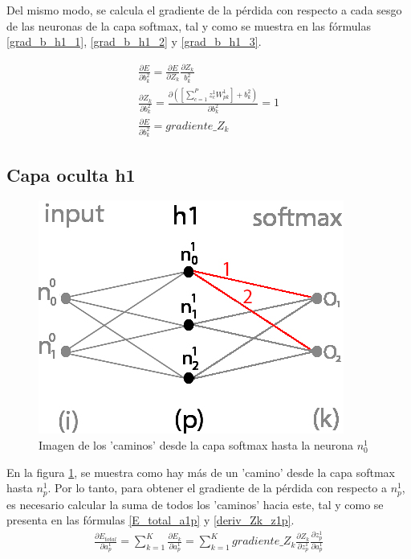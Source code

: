 Del mismo modo, se calcula el gradiente de la pérdida con respecto a cada sesgo de las neuronas de la capa softmax, tal y como se muestra en las fórmulas \ref{grad_b_h1_1}, \ref{grad_b_h1_2} y \ref{grad_b_h1_3}.

\begin{gather}
	\frac{\partial E}{\partial b^2_k} = \frac{\partial E}{\partial Z_k}   \frac{\partial Z_k}{b^2_k} \label{grad_b_h1_1} \\
	\frac{\partial Z_k }{\partial b^2_k } = \frac{\partial ([\sum_{c=1}^{P} z^1_c   W^1_{pk}] + b^2_k) }{\partial b^2_k } = 1 \label{grad_b_h1_2} \\
	\frac{\partial E}{\partial b^2_k} = gradiente\_Z_k \label{grad_b_h1_3}
\end{gather}

\subsection{Capa oculta h1}

\begin{figure}[H]
	\centering
	\includegraphics[scale=0.35]{imagenes/nn_caminos_posibles.jpg}  
	\caption{Imagen de los 'caminos' desde la capa softmax hasta la neurona $n^1_0$}
	\label{nn_caminos_posibles}
\end{figure}

En la figura \ref{nn_caminos_posibles}, se muestra como hay más de un 'camino' desde la capa softmax hasta $n^1_p$. Por lo tanto, para obtener el gradiente de la pérdida con respecto a $n^1_p$, es necesario calcular la suma de todos los 'caminos' hacia este, tal y como se presenta en las fórmulas \ref{E_total_a1p} y \ref{deriv_Zk_z1p}. \\

\begin{gather}
	\frac{\partial E_{total}}{\partial a^1_p} = \sum_{k=1}^K \frac{\partial E_k}{\partial a^1_p} = \sum_{k=1}^K  gradiente\_Z_k   \frac{\partial Z_k}{\partial z^1_p}   \frac{\partial z^1_p}{\partial a^1_p}
	\label{E_total_a1p}
\end{gather}


